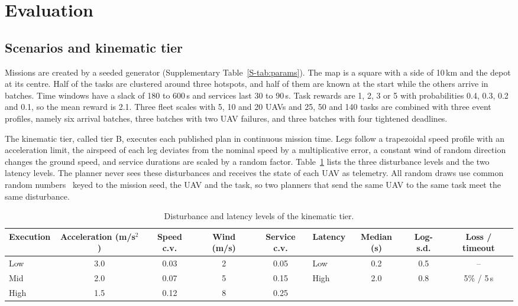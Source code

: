 \section{Evaluation}\label{sec:setup}
\subsection{Scenarios and kinematic tier}
Missions are created by a seeded generator (Supplementary Table~\ref{S-tab:params}). The map is a square with a side
of 10\,km and the depot at its centre. Half of the tasks are clustered around three hotspots, and half of them are
known at the start while the others arrive in batches. Time windows have a slack of 180 to 600\,s and services last 30
to 90\,s. Task rewards are 1, 2, 3 or 5 with probabilities 0.4, 0.3, 0.2 and 0.1, so the mean reward is 2.1. Three
fleet scales with 5, 10 and 20 UAVs and 25, 50 and 140 tasks are combined with three event profiles, namely six arrival
batches, three batches with two UAV failures, and three batches with four tightened deadlines.

The kinematic tier, called tier B, executes each published plan in continuous mission time. Legs follow a trapezoidal
speed profile with an acceleration limit, the airspeed of each leg deviates from the nominal speed by a multiplicative
error, a constant wind of random direction changes the ground speed, and service durations are scaled by a random
factor. Table~\ref{tab:levels} lists the three disturbance levels and the two latency levels. The planner never sees
these disturbances and receives the state of each UAV as telemetry. All random draws use common random
numbers~\cite{law2015simulation} keyed to the mission seed, the UAV and the task, so two planners that send the same
UAV to the same task meet the same disturbance.

\begin{table}[t]
\caption{Disturbance and latency levels of the kinematic tier.}\label{tab:levels}
\centering\small
\setlength{\tabcolsep}{4pt}
\begin{tabular}{lcccc@{\quad}lccc}
\toprule
Execution & Acceleration (m/s$^2$) & Speed c.v. & Wind (m/s) & Service c.v. & Latency & Median (s) & Log-s.d. & Loss / timeout \\
\midrule
Low & 3.0 & 0.03 & 2 & 0.05 & Low & 0.2 & 0.5 & -- \\
Mid & 2.0 & 0.07 & 5 & 0.15 & High & 2.0 & 0.8 & 5\% / 5\,s \\
High & 1.5 & 0.12 & 8 & 0.25 & & & & \\
\bottomrule
\end{tabular}
\end{table}

